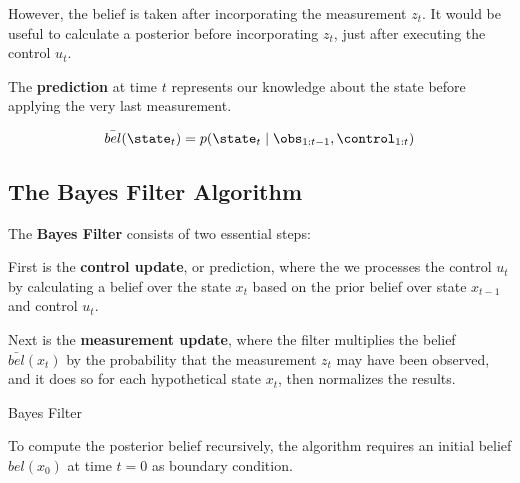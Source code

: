 However, the belief is taken after incorporating the measurement $z_t$.
It would be useful to calculate a posterior before incorporating $z_t$, just after executing the control $u_t$.

\begin{definition}[Prediction]
The \textbf{prediction} at time $t$ represents our knowledge about the state before applying the very last measurement.

\begin{equation}
  \bar{bel}(\state_{t}) = p(\state_{t} \mid \obs_{1:t-1}, \control_{1:t})
\end{equation}
\end{definition}

\subsection{The Bayes Filter Algorithm}

The \textbf{Bayes Filter} consists of two essential steps:

First is the \textbf{control update}, or prediction, where the we processes the control $u_t$ by calculating a belief over the state $x_t$ based on the prior belief over state $x_{t-1}$ and control $u_t$.

Next is the \textbf{measurement update}, where the filter multiplies the belief $\bar{bel}(x_t)$ by the probability that the measurement $z_t$ may have been observed, and it does so for each hypothetical state $x_t$, then normalizes the results.

\vspace{2mm}

\begin{algorithm}[H]
\caption{Bayes Filter}

\BlankLine
{}

\BlankLine
{}

\BlankLine
{}
\end{algorithm}

\vspace{2mm}

To compute the posterior belief recursively, the algorithm requires an initial belief $bel(x_0)$ at time $t=0$ as boundary condition.

